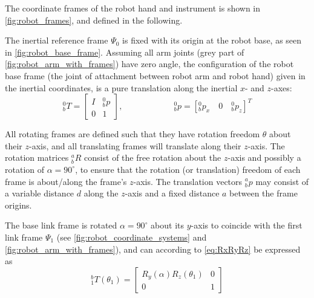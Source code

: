 The coordinate frames of the robot hand and instrument is shown in \autoref{fig:robot_frames}, and defined in the following.


The inertial reference frame $\Psi_0$ is fixed with its origin at the robot base, as seen in \autoref{fig:robot_base_frame}. Assuming all arm joints (grey part of \autoref{fig:robot_arm_with_frames}) have zero angle, the configuration of the robot base frame (the joint of attachment between robot arm and robot hand) given in the inertial coordinates, is a pure translation along the inertial $x$- and $z$-axes:
\begin{equation}
^0_b T = \begin{bmatrix}
I & ^0_bp\\
0 & 1
\end{bmatrix}, 
\qquad\qquad\qquad
^0_bp = [^0_bp_x \quad 0 \quad ^0_bp_z]^T
\end{equation}

All rotating frames are defined such that they have rotation freedom $\theta$ about their $z$-axis, and all translating frames will translate along their $z$-axis. The rotation matrices $^a_bR$ consist of the free rotation about the $z$-axis and possibly a rotation of $\alpha=90^\circ$, to ensure that the rotation (or translation) freedom of each frame is about/along the frame's $z$-axis. The translation vectors $^a_bp$ may consist of a variable distance $d$ along the $z$-axis and a fixed distance $a$ between the frame origins.

The base link frame is rotated $\alpha=90^\circ$ about its $y$-axis to coincide with the first link frame $\Psi_1$ (see \autoref{fig:robot_coordinate_systems} and \ref{fig:robot_arm_with_frames}), and can according to \autoref{eq:RxRyRz} be expressed as
\begin{equation}
^b_1 T(\theta_1) = 
\begin{bmatrix}
R_y(\alpha) R_z(\theta_1) & 0\\
0 & 1
\end{bmatrix}
\end{equation}

